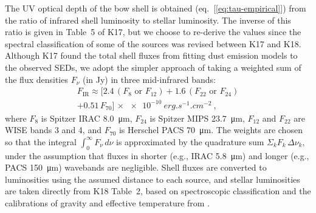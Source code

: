The UV optical depth of the bow shell is obtained
(eq.~[\ref{eq:tau-empirical}]) from the ratio of infrared shell
luminosity to stellar luminosity.  The inverse of this ratio is given
in Table~5 of K17, but we choose to re-derive the values since the
spectral classification of some of the sources was revised between K17
and K18.  Although K17 found the total shell fluxes from fitting dust
emission models to the observed SEDs, we adopt the simpler approach of
taking a weighted sum of the flux densities \(F_\nu\) (in \si{Jy}) in
three mid-infrared bands:
\begin{multline}
  \label{eq:total-ir-flux}
  F_{\text{IR}}  \approx \bigl[  2.4\,(F_8 \text{ or } F_{12})
    + 1.6\,(F_{22} \text{ or } F_{24})  \\
  + 0.51\,F_{70}\bigr]
  \,\times \SI{e-10}{erg.s^{-1}.cm^{-2}} \ ,
\end{multline}
where \(F_8\) is Spitzer IRAC \SI{8.0}{\um}, \(F_{24}\) is Spitzer
MIPS \SI{23.7}{\um}, \(F_{12}\) and \(F_{22}\) are WISE bands 3 and 4,
and \(F_{70}\) is Herschel PACS \SI{70}{\um}.  The weights are chosen
so that the integral \(\int_0^\infty F_\nu \,d\nu\) is approximated by the
quadrature sum \(\Sigma_k F_k\, \Delta\nu_k\), under the assumption that fluxes in
shorter (e.g., IRAC \SI{5.8}{\um}) and longer (e.g., PACS
\SI{150}{\um}) wavebands are negligible.  Shell fluxes are converted
to luminosities using the assumed distance to each source, and stellar
luminosities are taken directly from K18 Table~2, based on
spectroscopic classification and the calibrations of gravity and
effective temperature from \citet{Martins:2005a}.

